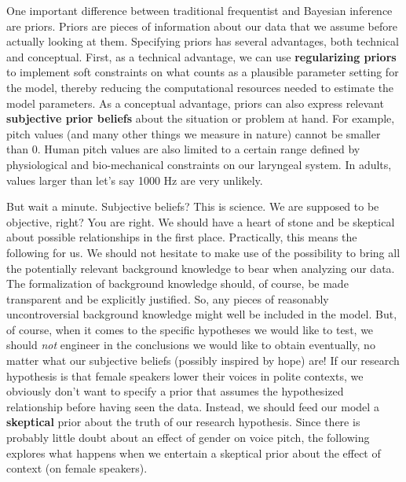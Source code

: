 \documentclass[nobib]{tufte-handout}
\begin{document}
One important difference between traditional frequentist and Bayesian inference are priors. Priors are pieces of information about our data that we assume before actually looking at them. Specifying priors has several advantages, both technical and conceptual. First, as a technical advantage, we can use \textbf{regularizing priors} to implement soft constraints on what counts as a plausible parameter setting for the model, thereby reducing the computational resources needed to estimate the model parameters.
%
%
As a conceptual advantage, priors can also express relevant \textbf{subjective prior beliefs} about the situation or problem at hand. For example, pitch values (and many other things we measure in nature) cannot be smaller than 0. Human pitch values are also limited to a certain range defined by physiological and bio-mechanical constraints on our laryngeal system. In adults, values larger than let's say 1000 Hz are very unlikely. 
 
But wait a minute. Subjective beliefs? This is science. We are supposed to be objective, right? You are right. We should have a heart of stone and be skeptical about possible relationships in the first place.
Practically, this means the following for us. We should not hesitate to make use of the
possibility to bring all the potentially relevant background knowledge to bear when analyzing
our data. The formalization of background knowledge should, of course, be made transparent and
be explicitly justified. So, any pieces of reasonably uncontroversial background knowledge
might well be included in the model. But, of course, when it comes to the specific hypotheses
we would like to test, we should \emph{not} engineer in the conclusions we
would like to obtain eventually, no matter what our subjective beliefs (possibly inspired by
hope) are! If our research hypothesis is that female speakers lower their voices in polite contexts, we obviously don't want to specify a prior that assumes the
hypothesized relationship before having seen the data. Instead, we should feed our model a
\textbf{skeptical} prior about the truth of our research hypothesis. Since there is probably
little doubt about an effect of gender on voice pitch, the following explores what happens when
we entertain a skeptical prior about the effect of context (on female speakers).

\end{document}
